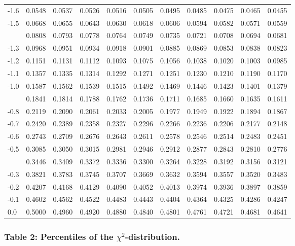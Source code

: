 \documentclass[
]{article}
\begin{document}
\begin{longtable}[t]{lllllllllll}
-1.6 & 0.0548 & 0.0537 & 0.0526 & 0.0516 & 0.0505 & 0.0495 & 0.0485 & 0.0475 & 0.0465 & 0.0455\\
-1.5 & 0.0668 & 0.0655 & 0.0643 & 0.0630 & 0.0618 & 0.0606 & 0.0594 & 0.0582 & 0.0571 & 0.0559\\
\addlinespace
-1.4 & 0.0808 & 0.0793 & 0.0778 & 0.0764 & 0.0749 & 0.0735 & 0.0721 & 0.0708 & 0.0694 & 0.0681\\
-1.3 & 0.0968 & 0.0951 & 0.0934 & 0.0918 & 0.0901 & 0.0885 & 0.0869 & 0.0853 & 0.0838 & 0.0823\\
-1.2 & 0.1151 & 0.1131 & 0.1112 & 0.1093 & 0.1075 & 0.1056 & 0.1038 & 0.1020 & 0.1003 & 0.0985\\
-1.1 & 0.1357 & 0.1335 & 0.1314 & 0.1292 & 0.1271 & 0.1251 & 0.1230 & 0.1210 & 0.1190 & 0.1170\\
-1.0 & 0.1587 & 0.1562 & 0.1539 & 0.1515 & 0.1492 & 0.1469 & 0.1446 & 0.1423 & 0.1401 & 0.1379\\
\addlinespace
-0.9 & 0.1841 & 0.1814 & 0.1788 & 0.1762 & 0.1736 & 0.1711 & 0.1685 & 0.1660 & 0.1635 & 0.1611\\
-0.8 & 0.2119 & 0.2090 & 0.2061 & 0.2033 & 0.2005 & 0.1977 & 0.1949 & 0.1922 & 0.1894 & 0.1867\\
-0.7 & 0.2420 & 0.2389 & 0.2358 & 0.2327 & 0.2296 & 0.2266 & 0.2236 & 0.2206 & 0.2177 & 0.2148\\
-0.6 & 0.2743 & 0.2709 & 0.2676 & 0.2643 & 0.2611 & 0.2578 & 0.2546 & 0.2514 & 0.2483 & 0.2451\\
-0.5 & 0.3085 & 0.3050 & 0.3015 & 0.2981 & 0.2946 & 0.2912 & 0.2877 & 0.2843 & 0.2810 & 0.2776\\
\addlinespace
-0.4 & 0.3446 & 0.3409 & 0.3372 & 0.3336 & 0.3300 & 0.3264 & 0.3228 & 0.3192 & 0.3156 & 0.3121\\
-0.3 & 0.3821 & 0.3783 & 0.3745 & 0.3707 & 0.3669 & 0.3632 & 0.3594 & 0.3557 & 0.3520 & 0.3483\\
-0.2 & 0.4207 & 0.4168 & 0.4129 & 0.4090 & 0.4052 & 0.4013 & 0.3974 & 0.3936 & 0.3897 & 0.3859\\
-0.1 & 0.4602 & 0.4562 & 0.4522 & 0.4483 & 0.4443 & 0.4404 & 0.4364 & 0.4325 & 0.4286 & 0.4247\\
0.0 & 0.5000 & 0.4960 & 0.4920 & 0.4880 & 0.4840 & 0.4801 & 0.4761 & 0.4721 & 0.4681 & 0.4641\\
\bottomrule
\end{longtable}

\newpage

\subsubsection{\texorpdfstring{Table 2: Percentiles of the
\(\chi^2\)-distribution.}{Table 2: Percentiles of the \textbackslash chi\^{}2-distribution.}}\label{table-2-percentiles-of-the-chi2-distribution.}
\end{document}
